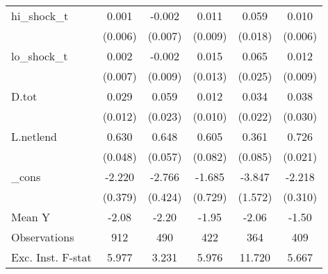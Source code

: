 {\begin{tabular}{l*{5}{c}}
\addlinespace
hi\_shock\_t  &       0.001         &      -0.002         &       0.011         &       0.059\sym{***}&       0.010         \\
            &     (0.006)         &     (0.007)         &     (0.009)         &     (0.018)         &     (0.006)         \\
\addlinespace
lo\_shock\_t  &       0.002         &      -0.002         &       0.015         &       0.065\sym{**} &       0.012         \\
            &     (0.007)         &     (0.009)         &     (0.013)         &     (0.025)         &     (0.009)         \\
\addlinespace
D.tot       &       0.029\sym{**} &       0.059\sym{**} &       0.012         &       0.034         &       0.038         \\
            &     (0.012)         &     (0.023)         &     (0.010)         &     (0.022)         &     (0.030)         \\
\addlinespace
L.netlend   &       0.630\sym{***}&       0.648\sym{***}&       0.605\sym{***}&       0.361\sym{***}&       0.726\sym{***}\\
            &     (0.048)         &     (0.057)         &     (0.082)         &     (0.085)         &     (0.021)         \\
\addlinespace
\_cons      &      -2.220\sym{***}&      -2.766\sym{***}&      -1.685\sym{**} &      -3.847\sym{**} &      -2.218\sym{***}\\
            &     (0.379)         &     (0.424)         &     (0.729)         &     (1.572)         &     (0.310)         \\
\midrule
Mean Y      &       -2.08         &       -2.20         &       -1.95         &       -2.06         &       -1.50         \\
Observations&         912         &         490         &         422         &         364         &         409         \\
Exc. Inst. F-stat&       5.977         &       3.231         &       5.976         &      11.720         &       5.667         \\
\bottomrule
\end{tabular}
}
